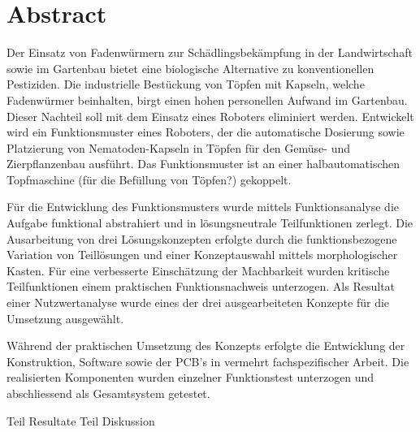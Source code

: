 \newpage
\section{Abstract}
Der Einsatz von Fadenwürmern zur Schädlingsbekämpfung in der Landwirtschaft sowie im Gartenbau bietet eine biologische Alternative zu konventionellen Pestiziden. Die industrielle Bestückung von Töpfen mit Kapseln, welche Fadenwürmer beinhalten, birgt einen hohen personellen Aufwand im Gartenbau. Dieser Nachteil soll mit dem Einsatz eines Roboters eliminiert werden. Entwickelt wird ein Funktionsmuster eines Roboters, der die automatische Dosierung sowie Platzierung von Nematoden-Kapseln in Töpfen für den Gemüse- und Zierpflanzenbau ausführt. Das Funktionsmuster ist an einer halbautomatischen Topfmaschine (für die Befüllung von Töpfen?) gekoppelt.
\newline

Für die Entwicklung des Funktionsmusters wurde mittels Funktionsanalyse die Aufgabe funktional abstrahiert und in lösungsneutrale Teilfunktionen zerlegt. Die Ausarbeitung von drei Lösungskonzepten erfolgte durch die funktionsbezogene Variation von Teillösungen und einer Konzeptauswahl mittels morphologischer Kasten. Für eine verbesserte Einschätzung der Machbarkeit wurden kritische Teilfunktionen einem praktischen Funktionsnachweis unterzogen. Als Resultat einer Nutzwertanalyse wurde eines der drei ausgearbeiteten Konzepte für die Umsetzung ausgewählt. 
\newline

Während der praktischen Umsetzung des Konzepts erfolgte die Entwicklung der Konstruktion, Software sowie der PCB’s in vermehrt fachspezifischer Arbeit. Die realisierten Komponenten wurden einzelner Funktionstest unterzogen und abschliessend als Gesamtsystem getestet.
\newline

Teil Resultate
\newline
Teil Diskussion
